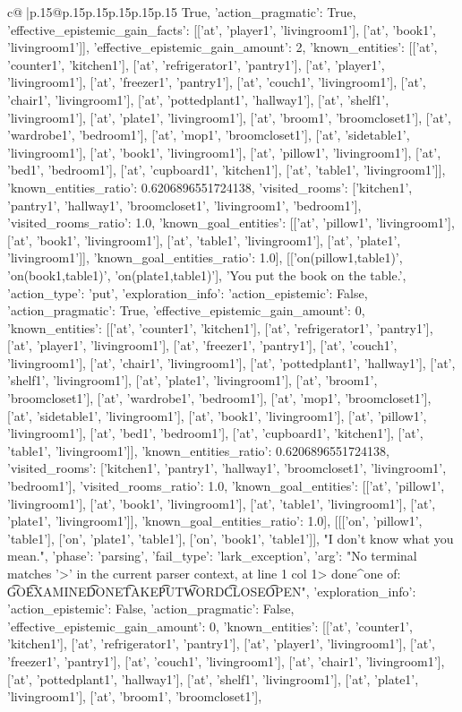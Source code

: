 \documentclass{article}
\begin{document}
{\begin{supertabular}{c@{$\;$}|p{.15\linewidth}@{}p{.15\linewidth}p{.15\linewidth}p{.15\linewidth}p{.15\linewidth}p{.15\linewidth}}
{{{True, 'action_pragmatic': True, 'effective_epistemic_gain_facts': [['at', 'player1', 'livingroom1'], ['at', 'book1', 'livingroom1']], 'effective_epistemic_gain_amount': 2, 'known_entities': [['at', 'counter1', 'kitchen1'], ['at', 'refrigerator1', 'pantry1'], ['at', 'player1', 'livingroom1'], ['at', 'freezer1', 'pantry1'], ['at', 'couch1', 'livingroom1'], ['at', 'chair1', 'livingroom1'], ['at', 'pottedplant1', 'hallway1'], ['at', 'shelf1', 'livingroom1'], ['at', 'plate1', 'livingroom1'], ['at', 'broom1', 'broomcloset1'], ['at', 'wardrobe1', 'bedroom1'], ['at', 'mop1', 'broomcloset1'], ['at', 'sidetable1', 'livingroom1'], ['at', 'book1', 'livingroom1'], ['at', 'pillow1', 'livingroom1'], ['at', 'bed1', 'bedroom1'], ['at', 'cupboard1', 'kitchen1'], ['at', 'table1', 'livingroom1']], 'known_entities_ratio': 0.6206896551724138, 'visited_rooms': ['kitchen1', 'pantry1', 'hallway1', 'broomcloset1', 'livingroom1', 'bedroom1'], 'visited_rooms_ratio': 1.0, 'known_goal_entities': [['at', 'pillow1', 'livingroom1'], ['at', 'book1', 'livingroom1'], ['at', 'table1', 'livingroom1'], ['at', 'plate1', 'livingroom1']], 'known_goal_entities_ratio': 1.0}}], [['on(pillow1,table1)', 'on(book1,table1)', 'on(plate1,table1)'], 'You put the book on the table.', {'action_type': 'put', 'exploration_info': {'action_epistemic': False, 'action_pragmatic': True, 'effective_epistemic_gain_amount': 0, 'known_entities': [['at', 'counter1', 'kitchen1'], ['at', 'refrigerator1', 'pantry1'], ['at', 'player1', 'livingroom1'], ['at', 'freezer1', 'pantry1'], ['at', 'couch1', 'livingroom1'], ['at', 'chair1', 'livingroom1'], ['at', 'pottedplant1', 'hallway1'], ['at', 'shelf1', 'livingroom1'], ['at', 'plate1', 'livingroom1'], ['at', 'broom1', 'broomcloset1'], ['at', 'wardrobe1', 'bedroom1'], ['at', 'mop1', 'broomcloset1'], ['at', 'sidetable1', 'livingroom1'], ['at', 'book1', 'livingroom1'], ['at', 'pillow1', 'livingroom1'], ['at', 'bed1', 'bedroom1'], ['at', 'cupboard1', 'kitchen1'], ['at', 'table1', 'livingroom1']], 'known_entities_ratio': 0.6206896551724138, 'visited_rooms': ['kitchen1', 'pantry1', 'hallway1', 'broomcloset1', 'livingroom1', 'bedroom1'], 'visited_rooms_ratio': 1.0, 'known_goal_entities': [['at', 'pillow1', 'livingroom1'], ['at', 'book1', 'livingroom1'], ['at', 'table1', 'livingroom1'], ['at', 'plate1', 'livingroom1']], 'known_goal_entities_ratio': 1.0}}], [[['on', 'pillow1', 'table1'], ['on', 'plate1', 'table1'], ['on', 'book1', 'table1']], "I don't know what you mean.", {'phase': 'parsing', 'fail_type': 'lark_exception', 'arg': "No terminal matches '>' in the current parser context, at line 1 col 1\n\n> done\n^\nExpected one of: \n\t* GO\n\t* EXAMINE\n\t* DONE\n\t* TAKE\n\t* PUT\n\t* WORD\n\t* CLOSE\n\t* OPEN\n", 'exploration_info': {'action_epistemic': False, 'action_pragmatic': False, 'effective_epistemic_gain_amount': 0, 'known_entities': [['at', 'counter1', 'kitchen1'], ['at', 'refrigerator1', 'pantry1'], ['at', 'player1', 'livingroom1'], ['at', 'freezer1', 'pantry1'], ['at', 'couch1', 'livingroom1'], ['at', 'chair1', 'livingroom1'], ['at', 'pottedplant1', 'hallway1'], ['at', 'shelf1', 'livingroom1'], ['at', 'plate1', 'livingroom1'], ['at', 'broom1', 'broomcloset1'], }}}
\end{supertabular}}
\end{document}
